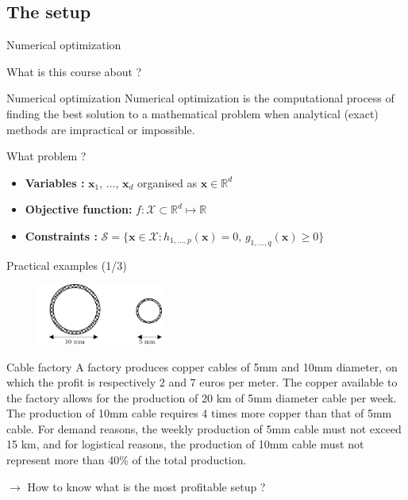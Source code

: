 \documentclass[aspectratio=1610]{beamer}
\begin{document}
\subsection{The setup}
\begin{frame}{Numerical optimization}

  What is this course about ?

  \pause

  \begin{block}{Numerical optimization}
    Numerical optimization is the computational process of finding the best solution to a mathematical problem when analytical (exact) methods are impractical or impossible.
  \end{block}


  What problem ? 
  \pause

  \begin{itemize}
    \item \textbf{Variables : } $\mathbf{x}_1$, $\dots$, $\mathbf{x}_d$ organised as $\mathbf{x}\in\mathbb{R}^d$
    \item \textbf{Objective function:} $f:\mathcal{X}\subset\mathbb{R}^d \mapsto \mathbb{R}$
    \item \textbf{Constraints :} $\mathcal{S} = \{\mathbf{x}\in\mathcal{X} : h_{1,\dots,p}(\mathbf{x})=0,\, g_{1,\dots,q}(\mathbf{x})\geq 0\}$
  \end{itemize}


\end{frame}

\begin{frame}{Practical examples (1/3)}
  
  \begin{figure}
    \includegraphics[height=2cm]{figures/cables.pdf}
  \end{figure}

  \begin{block}{Cable factory}
    \small
    A factory produces copper cables of 5mm and 10mm diameter, on which the profit is respectively 2 and 7 euros per meter. The copper available to the factory allows for the production of 20 km of 5mm diameter cable per week. The production of 10mm cable requires 4 times more copper than that of 5mm cable. For demand reasons, the weekly production of 5mm cable must not exceed 15 km, and for logistical reasons, the production of 10mm cable must not represent more than 40\% of the total production.
  \end{block}
  \pause

  $\rightarrow$ How to know what is the most profitable setup ?

\end{frame}
\end{document}
